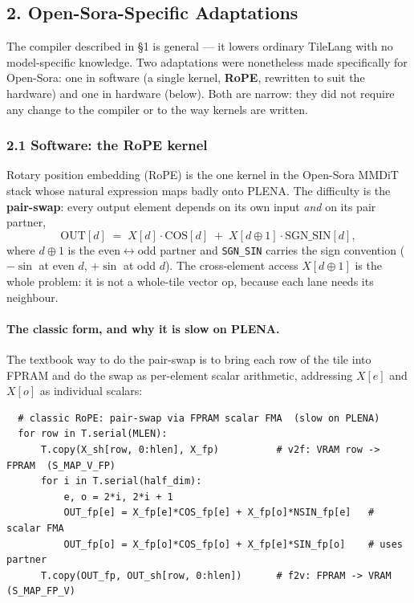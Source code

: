 \documentclass[
  10pt,
]{article}
\newcounter{none} %
\begin{document}
\subsection{2. Open-Sora-Specific Adaptations}\label{opensora-adaptations}

The compiler described in §1 is general --- it lowers ordinary TileLang
with no model-specific knowledge. Two adaptations were nonetheless made
specifically for Open-Sora: one in software (a single kernel,
\textbf{RoPE}, rewritten to suit the hardware) and one in hardware
(below). Both are narrow: they did not require any change to the
compiler or to the way kernels are written.

\subsubsection{2.1 Software: the RoPE kernel}\label{adapt-rope}

Rotary position embedding (RoPE) is the one kernel in the Open-Sora
MMDiT stack whose natural expression maps badly onto PLENA. The
difficulty is the \textbf{pair-swap}: every output element depends on its
own input \emph{and} on its pair partner,
\[
  \mathrm{OUT}[d] \;=\; X[d]\cdot\mathrm{COS}[d]
  \;+\; X[d \oplus 1]\cdot\mathrm{SGN\_SIN}[d],
\]
where \(d \oplus 1\) is the even\(\leftrightarrow\)odd partner and
\texttt{SGN\_SIN} carries the sign convention (\(-\sin\) at even \(d\),
\(+\sin\) at odd \(d\)). The cross-element access \(X[d\oplus 1]\) is the
whole problem: it is not a whole-tile vector op, because each lane needs
its neighbour.

\paragraph{The classic form, and why it is slow on PLENA.} The textbook
way to do the pair-swap is to bring each row of the tile into FPRAM and
do the swap as per-element scalar arithmetic, addressing \(X[e]\) and
\(X[o]\) as individual scalars:

\begin{verbatim}
  # classic RoPE: pair-swap via FPRAM scalar FMA  (slow on PLENA)
  for row in T.serial(MLEN):
      T.copy(X_sh[row, 0:hlen], X_fp)          # v2f: VRAM row -> FPRAM  (S_MAP_V_FP)
      for i in T.serial(half_dim):
          e, o = 2*i, 2*i + 1
          OUT_fp[e] = X_fp[e]*COS_fp[e] + X_fp[o]*NSIN_fp[e]   # scalar FMA
          OUT_fp[o] = X_fp[o]*COS_fp[o] + X_fp[e]*SIN_fp[o]    # uses partner
      T.copy(OUT_fp, OUT_sh[row, 0:hlen])      # f2v: FPRAM -> VRAM  (S_MAP_FP_V)
\end{verbatim}
\end{document}
